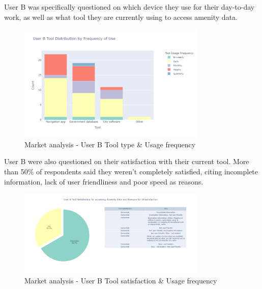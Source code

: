 User B was specifically questioned on which device they use for their day-to-day work, as well as what tool they are currently using to access amenity data.
\begin{figure}[h!]
    \centering
    \includegraphics[width=0.8\textwidth]{images/mr-userb-tool-freq.png}
    \caption{Market analysis - User B Tool type \& Usage frequency}
\end{figure}
User B were also questioned on their satisfaction with their current tool. More than 50\% of respondents said they weren't completely satisfied, citing incomplete information, lack of user friendliness and poor speed as reasons.
\begin{figure}[h!]
    \centering
    \includegraphics[width=0.8\textwidth]{images/mr-userb-tool-satisfaction.png}
    \caption{Market analysis - User B Tool satisfaction \& Usage frequency}
\end{figure}

